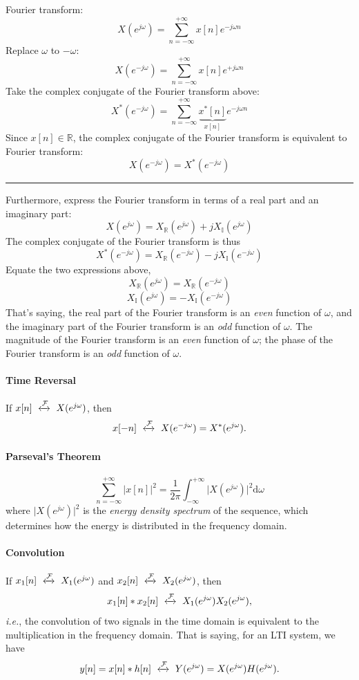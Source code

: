 \begin{dv}{}
Fourier transform:
\[
    X(e^{j\omega}) =  \sum_{n=-\infty}^{+\infty} x[n] e^{-j\omega n}
\]
Replace $\omega$ to $-\omega$:
\[
    X(e^{-j\omega}) =  \sum_{n=-\infty}^{+\infty} x[n] e^{+j\omega n}
\]
Take the complex conjugate of the Fourier transform above: 
\[
    X^{*}(e^{-j\omega}) =  \sum_{n=-\infty}^{+\infty} \underbrace{x^{*}[n]}_{x[n]} e^{-j\omega n}
\]
Since $x[n] \in \mathbb{R}$, the complex conjugate of the Fourier transform is equivalent to Fourier transform:
\[
    X(e^{-j\omega}) = X^{*}(e^{-j\omega})
\]
\rule{\textwidth}{.1ex}
Furthermore, express the Fourier transform in terms of a real part and an imaginary part:
\[
    X(e^{j\omega}) = X_{\mathbb{R}}(e^{j\omega}) + j X_{\mathbb{I}}(e^{j\omega})
\]
The complex conjugate of the Fourier transform is thus
\[
    X^{*}(e^{-j\omega}) = X_{\mathbb{R}}(e^{-j\omega}) - j X_{\mathbb{I}}(e^{-j\omega})
\]
Equate the two expressions above, 
\[
    X_{\mathbb{R}}(e^{j\omega}) = X_{\mathbb{R}}(e^{-j\omega})
\]
\[
    X_{\mathbb{I}}(e^{j\omega}) = -X_{\mathbb{I}}(e^{-j\omega})
\]
That's saying, the real part of the Fourier transform is an \textit{even} function of $\omega$, and the imaginary part of the Fourier transform is an \textit{odd} function of $\omega$.
The magnitude of the Fourier transform is an \textit{even} function of $\omega$; the phase of the Fourier transform is an \textit{odd} function of $\omega$.
\end{dv}

\paragraph{Time Reversal} If $x[n] \ \xleftrightarrow[]{\mathcal{F}} \ X(e^{j\omega})$, then
\[
    x[-n] \ \xleftrightarrow[]{\mathcal{F}} \  X(e^{-j\omega}) = X^*(e^{j \omega}).
\]


\paragraph{Parseval's Theorem}
\[
    \sum_{n=-\infty}^{+\infty} \lvert x[n] \rvert^2 =\frac{1}{2\pi} \int_{-\infty}^{+\infty} \lvert X(e^{j\omega}) \rvert^2 \mathrm{d}\omega 
\]
where $\lvert X(e^{j\omega}) \rvert^2$ is the \textit{energy density spectrum} of the sequence, which determines how the energy is distributed in the frequency domain.

\paragraph{Convolution} If $x_1[n] \ \xleftrightarrow[]{\mathcal{F}} \ X_1(e^{j\omega})$ and $x_2[n] \ \xleftrightarrow[]{\mathcal{F}} \ X_2(e^{j\omega})$, then 
\begin{equation}
    x_1[n] * x_2[n] \ \xleftrightarrow[]{\mathcal{F}} \ X_1(e^{j\omega}) X_2(e^{j\omega}),
\end{equation}
\textit{i.e.}, the convolution of two signals in the time domain is equivalent to the multiplication in the frequency domain. That is saying, for an LTI system, we have 
\[
    y[n] = x[n] * h[n] \ \xleftrightarrow[]{\mathcal{F}} \  Y(e^{j\omega}) = X(e^{j\omega})H(e^{j\omega}).
\]
    

